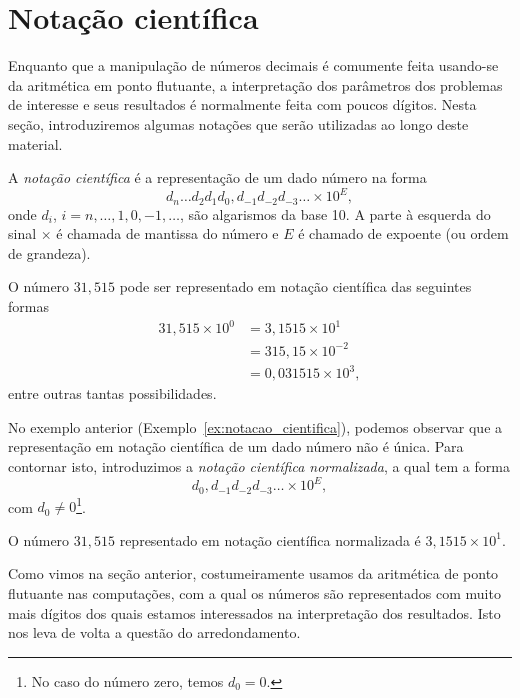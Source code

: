 \section{Notação científica}\label{cap_aritm_sec_notcient}

Enquanto que a manipulação de números decimais é comumente feita usando-se da aritmética em ponto flutuante, a interpretação dos parâmetros dos problemas de interesse e seus resultados é normalmente feita com poucos dígitos. Nesta seção, introduziremos algumas notações que serão utilizadas ao longo deste material.

A \emph{notação científica} é a representação de um dado número na forma
\begin{equation}
  d_{n}\ldots d_2d_1d_0,d_{-1}d_{-2}d_{-3}\ldots \times 10^{E},
\end{equation}
onde $d_i$, $i=n, \ldots, 1, 0, -1, \ldots$, são algarismos da base 10. A parte à esquerda do sinal $\times$ é chamada de mantissa do número e $E$ é chamado de expoente (ou ordem de grandeza).

\begin{ex}\label{ex:notacao_cientifica}
  O número $31,515$ pode ser representado em notação científica das seguintes formas
  \begin{align}
    31,515\times 10^0 &= 3,1515\times 10^{1} \\
                      &= 315,15\times 10^{-2} \\
                      &= 0,031515\times 10^{3},
  \end{align}
entre outras tantas possibilidades.
\end{ex}

No exemplo anterior (Exemplo~\ref{ex:notacao_cientifica}), podemos observar que a representação em notação científica de um dado número não é única. Para contornar isto, introduzimos a \emph{notação científica normalizada}, a qual tem a forma
\begin{equation}
  d_0,d_{-1}d_{-2}d_{-3}\ldots\times 10^{E},
\end{equation}
com $d_0 \neq 0$\footnote{No caso do número zero, temos $d_0=0$.}.

\begin{ex}
  O número $31,515$ representado em notação científica normalizada é $3,1515\times 10^{1}$.
\end{ex}

Como vimos na seção anterior, costumeiramente usamos da aritmética de ponto flutuante nas computações, com a qual os números são representados com muito mais dígitos dos quais estamos interessados na interpretação dos resultados. Isto nos leva de volta a questão do arredondamento.

